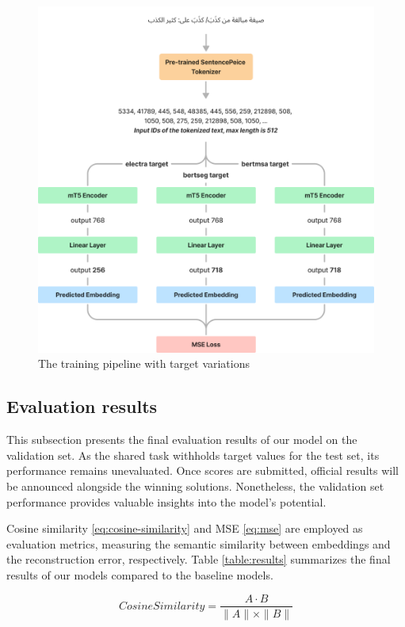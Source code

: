 \documentclass[15pt]{article}
\begin{document}
\begin{figure}[H]
    \centering
    \captionsetup{justification=centering}
    \includegraphics[width=\textwidth]{training.png}
    \caption{The training pipeline with target variations}
    \label{fig:training}
\end{figure}

\subsection{Evaluation results}

This subsection presents the final evaluation results of our model on the validation set. As the shared task withholds target values for the test set, its performance remains unevaluated. Once scores are submitted, official results will be announced alongside the winning solutions. Nonetheless, the validation set performance provides valuable insights into the model's potential.

Cosine similarity \ref{eq:cosine-similarity} and MSE \ref{eq:mse} are employed as evaluation metrics, measuring the semantic similarity between embeddings and the reconstruction error, respectively. Table \ref{table:results} summarizes the final results of our models compared to the baseline models.

\begin{equation}\label{eq:cosine-similarity}
    Cosine Similarity = \frac{A \cdot B}{\|A\| \times \|B\|}
\end{equation}
\end{document}
